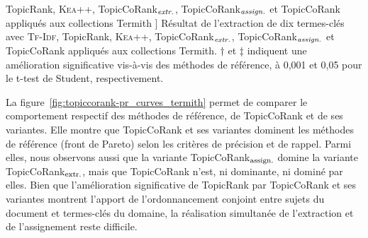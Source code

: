 \begin{table}
          TopicRank, \textsc{Kea++}, TopicCoRank$_\textnormal{\textit{extr.}}$,
          TopicCoRank$_\textnormal{\textit{assign.}}$ et TopicCoRank appliqués
          aux collections Termith
        ]{
          Résultat de l'extraction de dix termes-clés avec \textsc{Tf-Idf},
          TopicRank, \textsc{Kea++}, TopicCoRank$_\textnormal{\textit{extr.}}$,
          TopicCoRank$_\textnormal{\textit{assign.}}$ et TopicCoRank appliqués
          aux collections Termith. $\dagger$ et $\ddagger$ indiquent une
          amélioration significative vis-à-vis des méthodes de référence, à
          0,001 et 0,05 pour le t-test de Student, respectivement.
          \label{tab:topiccorank-comparison_results_termith}}
        \end{table}
        
        La figure~\ref{fig:topiccorank-pr_curves_termith} permet de comparer le
        comportement respectif des méthodes de référence, de TopicCoRank et de
        ses variantes. Elle montre que TopicCoRank et ses variantes dominent les
        méthodes de référence (front de Pareto) selon les critères de précision
        et de rappel. Parmi elles, nous observons aussi que la variante
        TopicCoRank$_\textnormal{assign.}$ domine la variante
        TopicCoRank$_\textnormal{extr.}$, mais que TopicCoRank n'est, ni
        dominante, ni dominé par elles. Bien que l'amélioration significative de
        TopicRank par TopicCoRank et ses variantes montrent l'apport de
        l'ordonnancement conjoint entre sujets du document et termes-clés du
        domaine, la réalisation simultanée de l'extraction et de l'assignement
        reste difficile.
        

